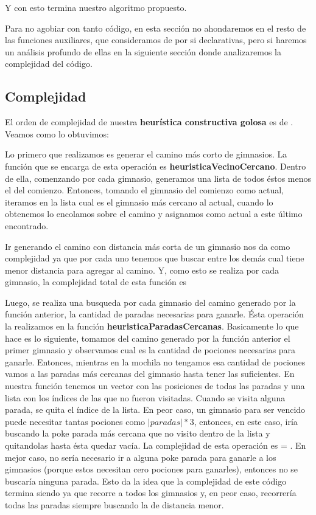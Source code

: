 Y con esto termina nuestro algoritmo propuesto.

Para no agobiar con tanto código, en esta sección no ahondaremos en el resto de las funciones auxiliares, que consideramos de por si declarativas, pero si haremos un análisis profundo de ellas en la siguiente sección donde analizaremos la complejidad del código.


\subsection{Complejidad}

El orden de complejidad de nuestra \textbf{heurística constructiva golosa} es de . Veamos como lo obtuvimos:

Lo primero que realizamos es generar el camino más corto de gimnasios. La función que se encarga de esta operación es \textbf{heuristicaVecinoCercano}. Dentro de ella, comenzando por cada gimnasio, generamos una lista de todos éstos menos el del comienzo. Entonces, tomando el gimnasio del comienzo como actual, iteramos en la lista cual es el gimnasio más cercano al actual, cuando lo obtenemos lo encolamos sobre el camino y asignamos como actual a este último encontrado.

Ir generando el camino con distancia más corta de un gimnasio nos da como complejidad  ya que por cada uno tenemos que buscar entre los demás cual tiene menor distancia para agregar al camino. Y, como esto se realiza por cada gimnasio, la complejidad total de esta función es 

Luego, se realiza una busqueda por cada gimnasio del camino generado por la función anterior, la cantidad de paradas necesarias para ganarle. Ésta operación la realizamos en la función \textbf{heuristicaParadasCercanas}. Basicamente lo que hace es lo siguiente, tomamos del camino generado por la función anterior el primer gimnasio y observamos cual es la cantidad de pociones necesarias para ganarle. Entonces, mientras en la mochila no tengamos esa cantidad de pociones vamos a las paradas más cercanas del gimnasio hasta tener las suficientes. En nuestra función tenemos un vector con las posiciones de todas las paradas y una lista con los índices de las que no fueron visitadas. Cuando se visita alguna parada, se quita el índice de la lista. En peor caso, un gimnasio para ser vencido puede necesitar tantas pociones como $|paradas|*3$, entonces, en este caso, iría buscando la poke parada más cercana que no visito dentro de la lista y quitandolas hasta ésta quedar vacía. La complejidad de esta operación es  = . En mejor caso, no sería necesario ir a alguna poke parada para ganarle a los gimnasios (porque estos necesitan cero pociones para ganarles), entonces no se buscaría ninguna parada. 
Esto da la idea que la complejidad de este código termina siendo  ya que recorre a todos los gimnasios y, en peor caso, recorrería todas las paradas siempre buscando la de distancia menor.

